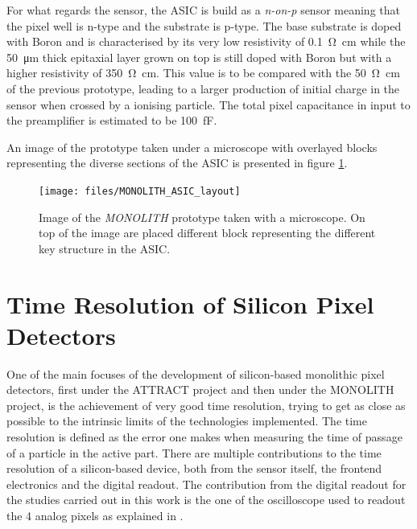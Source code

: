 		For what regards the sensor, the ASIC is build as a \textit{n-on-p} sensor meaning that the pixel well is n-type and the substrate is p-type. The base substrate is doped with Boron and is characterised by its very low resistivity of \SI{0.1}{\ohm \centi\meter} while the \SI{50}{\micro\meter} thick epitaxial layer grown on top is still doped with Boron but with a higher resistivity of \SI{350}{\ohm \centi\meter}. This value is to be compared with the \SI{50}{\ohm \centi\meter} of the previous prototype, leading to a larger production of initial charge in the sensor when crossed by a ionising particle. The total pixel capacitance in input to the preamplifier is estimated to be \SI{100}{\femto\farad}. 
		
		An image of the prototype taken under a microscope with overlayed blocks representing the diverse sections of the ASIC is presented in figure \ref{im:MONOLITH_ASIC_layout}.
		\begin{figure}[h]
			\centering
			\texttt{[image: files/MONOLITH\_ASIC\_layout]}
			\caption{Image of the \textit{MONOLITH} prototype taken with a microscope. On top of the image are placed different block representing the different key structure in the ASIC. }
			\label{im:MONOLITH_ASIC_layout}
		\end{figure} 
		 
		
		
	\clearpage
	\section{Time Resolution of Silicon Pixel Detectors}
	One of the main focuses of the development of silicon-based monolithic pixel detectors, first under the ATTRACT project and then under the MONOLITH project, is the achievement of very good time resolution, trying to get as close as possible to the intrinsic limits of the technologies implemented. The time resolution is defined as the error one makes when measuring the time of passage of a particle in the active part. There are multiple contributions to the time resolution of a silicon-based device, both from the sensor itself, the frontend electronics and the digital readout. The contribution from the digital readout for the studies carried out in this work is the one of the oscilloscope used to readout the 4 analog pixels as explained in . 
	
